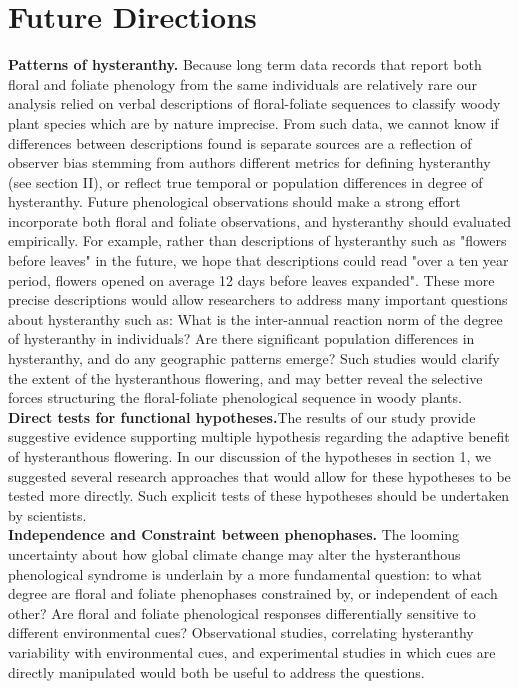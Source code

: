 \documentclass{article}\usepackage[]{graphicx}\usepackage[]{color}
\begin{document}
\section*{Future Directions}
\indent \textbf{Patterns of hysteranthy.} Because long term data records that report both floral and foliate phenology from the same individuals are relatively rare \citep{Wolkovich2014} our analysis relied on verbal descriptions of floral-foliate sequences to classify woody plant species which are by nature imprecise. From such data, we cannot know if differences between descriptions found is separate sources are a reflection of observer bias stemming from authors different metrics for defining hysteranthy (see section II), or reflect true temporal or population differences in degree of hysteranthy. Future phenological observations should make a strong effort incorporate both floral and foliate observations, and hysteranthy should evaluated empirically. For example, rather than descriptions of hysteranthy such as "flowers before leaves" in the future, we hope that descriptions could read "over a ten year period, flowers opened on average 12 days before leaves expanded". These more precise descriptions would allow researchers to address many important questions about hysteranthy such as: What is the inter-annual reaction norm of the degree of hysteranthy in individuals? Are there significant population differences in hysteranthy, and do any geographic patterns emerge? Such studies would clarify the extent of the hysteranthous flowering, and may better reveal the selective forces structuring the floral-foliate phenological sequence in woody plants.\\
\indent \textbf{Direct tests for functional hypotheses.}The results of our study provide suggestive evidence supporting multiple hypothesis regarding the adaptive benefit of hysteranthous flowering.  In our discussion of the hypotheses in section 1, we suggested several research approaches that would allow for these hypotheses to be tested more directly. Such explicit tests of these hypotheses should be undertaken by scientists.\\
\indent \textbf{Independence and Constraint between phenophases.} The looming uncertainty about how global climate change may alter the hysteranthous phenological syndrome is underlain by a more fundamental question: to what degree are floral and foliate phenophases constrained by, or independent of each other? Are floral and foliate phenological responses differentially sensitive to different environmental cues? Observational studies, correlating hysteranthy variability with environmental cues, and experimental studies in which cues are directly manipulated would both be useful to address the questions.\\
\end{document}
